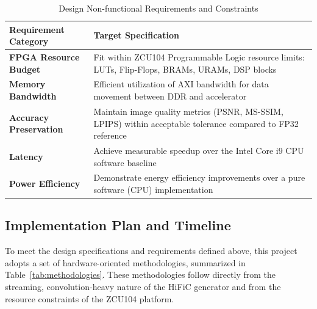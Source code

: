 \begin{table}[H]
\centering
\caption{Design Non-functional Requirements and Constraints}
\label{tab:nonfunctional_req}
\begin{tabularx}{\textwidth}{|>{\raggedright\arraybackslash}p{}|X|}
\hline
\textbf{Requirement Category} & \textbf{Target Specification} \\
\hline
\textbf{FPGA Resource Budget} & Fit within ZCU104 Programmable Logic resource limits: LUTs, Flip-Flops, BRAMs, URAMs, DSP blocks \\
\hline
\textbf{Memory Bandwidth} & Efficient utilization of AXI bandwidth for data movement between DDR and accelerator \\
\hline
\textbf{Accuracy Preservation} & Maintain image quality metrics (PSNR, MS-SSIM, LPIPS) within acceptable tolerance compared to FP32 reference \\
\hline
\textbf{Latency} & Achieve measurable speedup over the Intel Core i9 CPU software baseline \\
\hline
\textbf{Power Efficiency} & Demonstrate energy efficiency improvements over a pure software (CPU) implementation \\
\hline
\end{tabularx}
\end{table}

\subsection{Implementation Plan and Timeline}

To meet the design specifications and requirements defined above, this project adopts a set of hardware-oriented methodologies, summarized in Table~\ref{tab:methodologies}. These methodologies follow directly from the streaming, convolution-heavy nature of the HiFiC generator and from the resource constraints of the ZCU104 platform.

